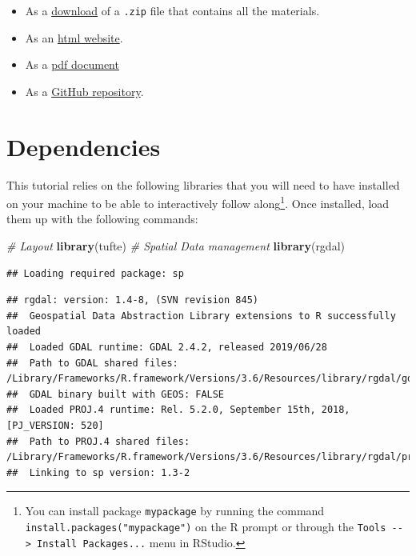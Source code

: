 \documentclass[]{book}
\newenvironment{Shaded}{\begin{snugshade}}{\end{snugshade}}
\newcommand{\KeywordTok}[1]{\textcolor[rgb]{0.13,0.29,0.53}{\textbf{#1}}}
\newcommand{\CommentTok}[1]{\textcolor[rgb]{0.56,0.35,0.01}{\textit{#1}}}
\newcommand{\NormalTok}[1]{#1}
\providecommand{\tightlist}{%
  \setlength{\itemsep}{0pt}\setlength{\parskip}{0pt}}
\begin{document}
\begin{itemize}
\tightlist
\item
  As a
  \href{https://github.com/GDSL-UL/san/archive/master.zip}{download} of
  a \texttt{.zip} file that contains all the materials.
\item
  As an \href{https://gdsl-ul.github.io/san/flows.html}{html website}.
\item
  As a
  \href{https://gdsl-ul.github.io/san/spatial_analysis_notes.pdf}{pdf
  document}
\item
  As a \href{https://github.com/GDSL-UL/san}{GitHub repository}.
\end{itemize}

\section{Dependencies}\label{dependencies-2}

This tutorial relies on the following libraries that you will need to
have installed on your machine to be able to interactively follow
along\footnote{You can install package \texttt{mypackage} by running the
  command \texttt{install.packages("mypackage")} on the R prompt or
  through the \texttt{Tools\ -\/-\textgreater{}\ Install\ Packages...}
  menu in RStudio.}. Once installed, load them up with the following
commands:

\begin{Shaded}
\begin{Highlighting}[]
\CommentTok{# Layout}
\KeywordTok{library}\NormalTok{(tufte)}
\CommentTok{# Spatial Data management}
\KeywordTok{library}\NormalTok{(rgdal)}
\end{Highlighting}
\end{Shaded}

\begin{verbatim}
## Loading required package: sp
\end{verbatim}

\begin{verbatim}
## rgdal: version: 1.4-8, (SVN revision 845)
##  Geospatial Data Abstraction Library extensions to R successfully loaded
##  Loaded GDAL runtime: GDAL 2.4.2, released 2019/06/28
##  Path to GDAL shared files: /Library/Frameworks/R.framework/Versions/3.6/Resources/library/rgdal/gdal
##  GDAL binary built with GEOS: FALSE 
##  Loaded PROJ.4 runtime: Rel. 5.2.0, September 15th, 2018, [PJ_VERSION: 520]
##  Path to PROJ.4 shared files: /Library/Frameworks/R.framework/Versions/3.6/Resources/library/rgdal/proj
##  Linking to sp version: 1.3-2
\end{verbatim}
\end{document}

